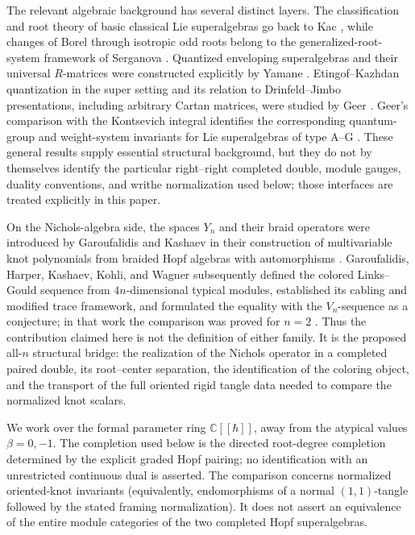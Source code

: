 \documentclass[11pt,a4paper]{article}
\theoremstyle{definition}
\theoremstyle{remark}
\begin{document}
The relevant algebraic background has several distinct layers.  The
classification and root theory of basic classical Lie superalgebras go
back to Kac \cite{Kac}, while changes of Borel through isotropic odd roots
belong to the generalized-root-system framework of Serganova
\cite{Serganova}.  Quantized enveloping superalgebras and their universal
\(R\)-matrices were constructed explicitly by Yamane \cite{Yamane}.
Etingof--Kazhdan quantization in the super setting and its relation to
Drinfeld--Jimbo presentations, including arbitrary Cartan matrices, were
studied by Geer \cite{GeerEK,GeerCartan}.  Geer's comparison with the
Kontsevich integral identifies the corresponding quantum-group and
weight-system invariants for Lie superalgebras of type A--G
\cite{GeerKontsevich}.  These general results supply essential structural
background, but they do not by themselves identify the particular
right--right completed double, module gauges, duality conventions, and
writhe normalization used below; those interfaces are treated explicitly
in this paper.

On the Nichols-algebra side, the spaces \(Y_n\) and their braid operators
were introduced by Garoufalidis and Kashaev in their construction of
multivariable knot polynomials from braided Hopf algebras with
automorphisms \cite{GK}.  Garoufalidis, Harper, Kashaev, Kohli, and Wagner
subsequently defined the colored Links--Gould sequence from
\(4n\)-dimensional typical modules, established its cabling and modified
trace framework, and formulated the equality with the \(V_n\)-sequence as
a conjecture; in that work the comparison was proved for \(n=2\)
\cite[Conjecture~1.4 and Theorem~1.5]{ColoredLG}.  Thus the contribution
claimed here is not the definition of either family.  It is the proposed
all-\(n\) structural bridge: the realization of the Nichols operator in a
completed paired double, its root--center separation, the identification
of the coloring object, and the transport of the full oriented rigid
tangle data needed to compare the normalized knot scalars.

We work over the formal parameter ring \(\mathbb C[[\hbar]]\), away from the
atypical values \(\beta=0,-1\).  The completion used below is the directed
root-degree completion determined by the explicit graded Hopf pairing; no
identification with an unrestricted continuous dual is asserted.  The
comparison concerns normalized oriented-knot invariants (equivalently,
endomorphisms of a normal \((1,1)\)-tangle followed by the stated framing
normalization).  It does not assert an equivalence of the entire module
categories of the two completed Hopf superalgebras.
\end{document}

